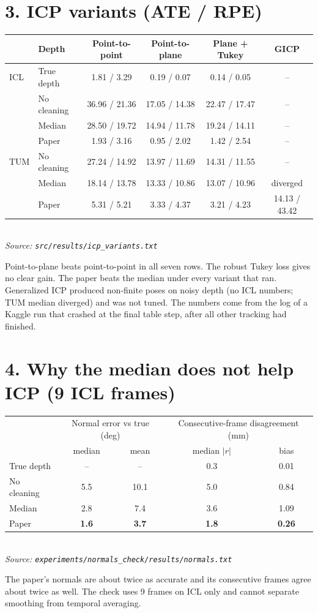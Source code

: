 \documentclass[10pt,a4paper]{article}
\newcommand{\src}[1]{{\footnotesize\emph{Source: \texttt{#1}}}}
\begin{document}
\section*{3. ICP variants (ATE / RPE)}
\begin{center}
\small
\begin{tabular}{llcccc}\toprule
 & Depth & Point-to-point & Point-to-plane & Plane + Tukey & GICP\\\midrule
ICL & True depth & 1.81 / 3.29 & 0.19 / 0.07 & 0.14 / 0.05 & --\\
 & No cleaning & 36.96 / 21.36 & 17.05 / 14.38 & 22.47 / 17.47 & --\\
 & Median & 28.50 / 19.72 & 14.94 / 11.78 & 19.24 / 14.11 & --\\
 & Paper & 1.93 / 3.16 & 0.95 / 2.02 & 1.42 / 2.54 & --\\\midrule
TUM & No cleaning & 27.24 / 14.92 & 13.97 / 11.69 & 14.31 / 11.55 & --\\
 & Median & 18.14 / 13.78 & 13.33 / 10.86 & 13.07 / 10.96 & diverged\\
 & Paper & 5.31 / 5.21 & 3.33 / 4.37 & 3.21 / 4.23 & 14.13 / 43.42\\\bottomrule
\end{tabular}\\[2pt]\src{src/results/icp\_variants.txt}
\end{center}
Point-to-plane beats point-to-point in all seven rows. The robust Tukey loss gives no clear gain. The paper beats the median under every variant that ran. Generalized ICP produced non-finite poses on noisy depth (no ICL numbers; TUM median diverged) and was not tuned. The numbers come from the log of a Kaggle run that crashed at the final table step, after all other tracking had finished.

\section*{4. Why the median does not help ICP (9 ICL frames)}
\begin{center}
\begin{tabular}{lcccc}\toprule
 & \multicolumn{2}{c}{Normal error vs true (deg)} & \multicolumn{2}{c}{Consecutive-frame disagreement (mm)}\\
 & median & mean & median $|r|$ & bias\\\midrule
True depth & -- & -- & 0.3 & 0.01\\
No cleaning & 5.5 & 10.1 & 5.0 & 0.84\\
Median & 2.8 & 7.4 & 3.6 & 1.09\\
Paper & \textbf{1.6} & \textbf{3.7} & \textbf{1.8} & \textbf{0.26}\\\bottomrule
\end{tabular}\\[2pt]\src{experiments/normals\_check/results/normals.txt}
\end{center}
The paper's normals are about twice as accurate and its consecutive frames agree about twice as well. The check uses 9 frames on ICL only and cannot separate smoothing from temporal averaging.
\end{document}
